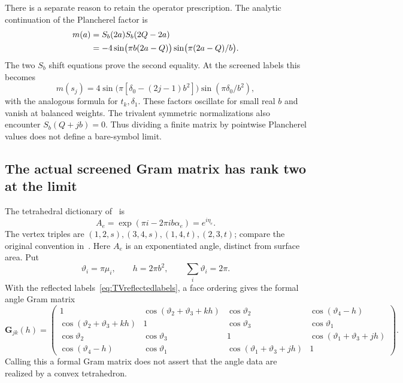 \documentclass[11pt,a4paper]{article}
\numberwithin{equation}{section}
\theoremstyle{definition}
\theoremstyle{remark}
\begin{document}
There is a separate reason to retain the operator prescription.
The analytic continuation of the Plancherel factor is
\begin{align}
 m(a)&=S_b(2a)S_b(2Q-2a)\notag\\
 &=-4\sin\bigl(\pi b(2a-Q)\bigr)
        \sin\bigl(\pi(2a-Q)/b\bigr).
 \label{eq:continuedPlancherel}
\end{align}
The two $S_b$ shift equations prove the second equality.
At the screened labels this becomes
\begin{equation}
 m(s_j)=
 4\sin\bigl(\pi[\delta_0-(2j-1)b^2]\bigr)
       \sin(\pi\delta_0/b^2),
 \label{eq:screenedPlancherel}
\end{equation}
with the analogous formula for $t_k,\delta_1$. These factors
oscillate for small real $b$ and vanish at balanced weights.
The trivalent symmetric normalizations also encounter
$S_b(Q+jb)=0$. Thus dividing a finite matrix by pointwise
Plancherel values does not define a bare-symbol limit.

\subsection{The actual screened Gram matrix has rank two at the limit}

The tetrahedral dictionary of~\cite[Section~3]{TeschnerVartanov}
is
\[
 A_e=\exp(\pi i-2\pi ib\alpha_e)=e^{i\eta_e}.
\]
The vertex triples are $(1,2,s),(3,4,s),(1,4,t),(2,3,t)$;
compare the original convention in~\cite{MurakamiYano}.
Here $A_e$ is an exponentiated angle, distinct from surface area.
Put
\[
 \vartheta_i=\pi\mu_i,\qquad h=2\pi b^2,\qquad
 \sum_i\vartheta_i=2\pi.
\]
With the reflected labels~\eqref{eq:TVreflectedlabels}, a
face ordering gives the formal angle Gram matrix
\begin{equation}
 \mathbf G_{jk}(h)=
 \begin{pmatrix}
 1&\cos(\vartheta_2+\vartheta_3+kh)&\cos\vartheta_2&
                                      \cos(\vartheta_4-h)\\
 \cos(\vartheta_2+\vartheta_3+kh)&1&\cos\vartheta_3&\cos\vartheta_1\\
 \cos\vartheta_2&\cos\vartheta_3&1&
                                      \cos(\vartheta_1+\vartheta_3+jh)\\
 \cos(\vartheta_4-h)&\cos\vartheta_1&
                    \cos(\vartheta_1+\vartheta_3+jh)&1
 \end{pmatrix}.
 \label{eq:screenedangleGram}
\end{equation}
Calling this a formal Gram matrix does not assert that the
angle data are realized by a convex tetrahedron.
\end{document}
